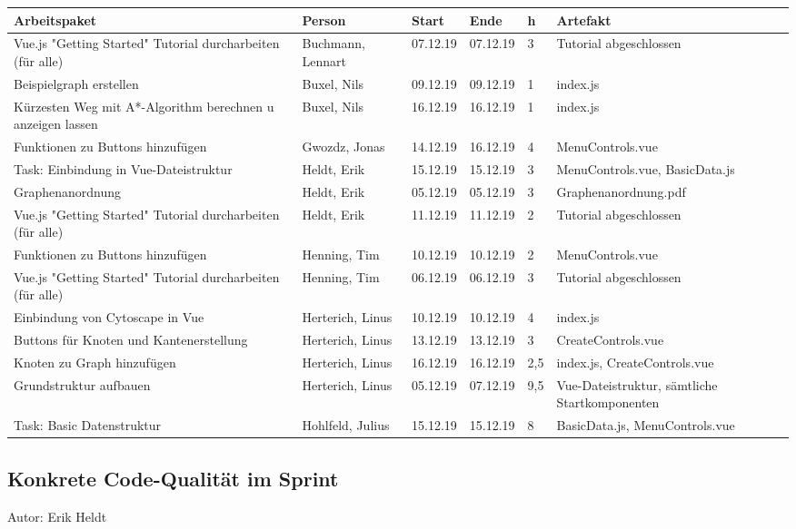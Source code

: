 \begin{longtable}{|p{4cm}|l|l|l|l|l|}
        \hline
	Arbeitspaket & Person & Start & Ende & h & Artefakt\\
        \hline
	Vue.js "Getting Started" Tutorial durcharbeiten (für alle) & Buchmann, Lennart & 07.12.19 & 07.12.19 & 3 & Tutorial abgeschlossen\\ \hline
	Beispielgraph erstellen & Buxel, Nils & 09.12.19 & 09.12.19 & 1 & index.js\\ \hline
	Kürzesten Weg mit A*-Algorithm berechnen u anzeigen lassen & Buxel, Nils &16.12.19 & 16.12.19 & 1 & index.js\\ \hline
	Funktionen zu Buttons hinzufügen & Gwozdz, Jonas & 14.12.19 & 16.12.19 & 4 & MenuControls.vue\\ \hline
	Task: Einbindung in Vue-Dateistruktur & Heldt, Erik & 15.12.19 & 15.12.19 & 3 & MenuControls.vue, BasicData.js\\ \hline
	Graphenanordnung & Heldt, Erik & 05.12.19 & 05.12.19 & 3 & Graphenanordnung.pdf\\ \hline
	Vue.js "Getting Started" Tutorial durcharbeiten (für alle) & Heldt, Erik & 11.12.19 & 11.12.19 & 2 & Tutorial abgeschlossen\\ \hline
	Funktionen zu Buttons hinzufügen & Henning, Tim & 10.12.19 & 10.12.19 & 2 & MenuControls.vue\\ \hline
	Vue.js "Getting Started" Tutorial durcharbeiten (für alle) & Henning, Tim & 06.12.19 & 06.12.19 & 3 & Tutorial abgeschlossen\\ \hline
	Einbindung von Cytoscape in Vue & Herterich, Linus & 10.12.19 & 10.12.19 & 4 & index.js\\ \hline
	Buttons für Knoten und Kantenerstellung & Herterich, Linus & 13.12.19 & 13.12.19 & 3 & CreateControls.vue\\ \hline
	Knoten zu Graph hinzufügen & Herterich, Linus & 16.12.19 & 16.12.19 & 2,5 & index.js, CreateControls.vue\\ \hline
	Grundstruktur aufbauen & Herterich, Linus & 05.12.19 & 07.12.19 & 9,5 & Vue-Dateistruktur, sämtliche Startkomponenten\\ \hline
	Task: Basic Datenstruktur & Hohlfeld, Julius & 15.12.19 & 15.12.19 & 8 & BasicData.js, MenuControls.vue\\ \hline
      \end{longtable}

\subsection{Konkrete Code-Qualität im Sprint}
{\small Autor: Erik Heldt}

